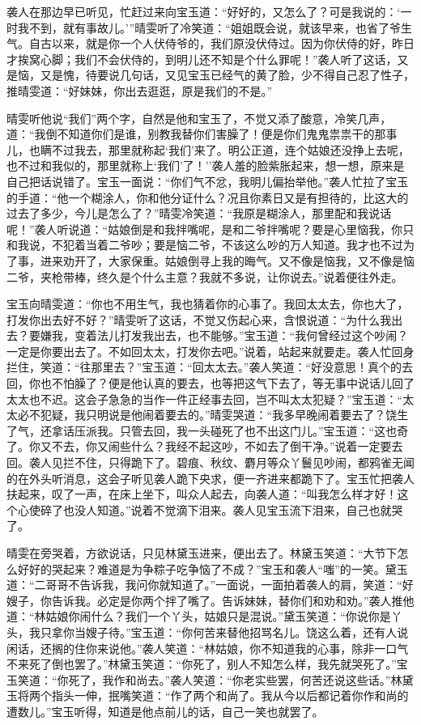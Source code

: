 袭人在那边早已听见，忙赶过来向宝玉道：``好好的，又怎么了？可是我说的：`一时我不到，就有事故儿。'''晴雯听了冷笑道：``姐姐既会说，就该早来，也省了爷生气。自古以来，就是你一个人伏侍爷的，我们原没伏侍过。因为你伏侍的好，昨日才挨窝心脚；我们不会伏侍的，到明儿还不知是个什么罪呢！''袭人听了这话，又是恼，又是愧，待要说几句话，又见宝玉已经气的黄了脸，少不得自己忍了性子，推晴雯道：``好妹妹，你出去逛逛，原是我们的不是。''

晴雯听他说``我们''两个字，自然是他和宝玉了，不觉又添了酸意，冷笑几声，道：``我倒不知道你们是谁，别教我替你们害臊了！便是你们鬼鬼祟祟干的那事儿，也瞒不过我去，那里就称起`我们'来了。明公正道，连个姑娘还没挣上去呢，也不过和我似的，那里就称上`我们'了！''袭人羞的脸紫胀起来，想一想，原来是自己把话说错了。宝玉一面说：``你们气不忿，我明儿偏抬举他。''袭人忙拉了宝玉的手道：``他一个糊涂人，你和他分证什么？况且你素日又是有担待的，比这大的过去了多少，今儿是怎么了？''晴雯冷笑道：``我原是糊涂人，那里配和我说话呢！''袭人听说道：``姑娘倒是和我拌嘴呢，是和二爷拌嘴呢？要是心里恼我，你只和我说，不犯着当着二爷吵；要是恼二爷，不该这么吵的万人知道。我才也不过为了事，进来劝开了，大家保重。姑娘倒寻上我的晦气。又不像是恼我，又不像是恼二爷，夹枪带棒，终久是个什么主意？我就不多说，让你说去。''说着便往外走。

宝玉向晴雯道：``你也不用生气，我也猜着你的心事了。我回太太去，你也大了，打发你出去好不好？''晴雯听了这话，不觉又伤起心来，含恨说道：``为什么我出去？要嫌我，变着法儿打发我出去，也不能够。''宝玉道：``我何曾经过这个吵闹？一定是你要出去了。不如回太太，打发你去吧。''说着，站起来就要走。袭人忙回身拦住，笑道：``往那里去？''宝玉道：``回太太去。''袭人笑道：``好没意思！真个的去回，你也不怕臊了？便是他认真的要去，也等把这气下去了，等无事中说话儿回了太太也不迟。这会子急急的当作一件正经事去回，岂不叫太太犯疑？''宝玉道：``太太必不犯疑，我只明说是他闹着要去的。''晴雯哭道：``我多早晚闹着要去了？饶生了气，还拿话压派我。只管去回，我一头碰死了也不出这门儿。''宝玉道：``这也奇了。你又不去，你又闹些什么？我经不起这吵，不如去了倒干净。''说着一定要去回。袭人见拦不住，只得跪下了。碧痕、秋纹、麝月等众丫鬟见吵闹，都鸦雀无闻的在外头听消息，这会子听见袭人跪下央求，便一齐进来都跪下了。宝玉忙把袭人扶起来，叹了一声，在床上坐下，叫众人起去，向袭人道：``叫我怎么样才好！这个心使碎了也没人知道。''说着不觉滴下泪来。袭人见宝玉流下泪来，自己也就哭了。

晴雯在旁哭着，方欲说话，只见林黛玉进来，便出去了。林黛玉笑道：``大节下怎么好好的哭起来？难道是为争粽子吃争恼了不成？''宝玉和袭人``嗤''的一笑。黛玉道：``二哥哥不告诉我，我问你就知道了。''一面说，一面拍着袭人的肩，笑道：``好嫂子，你告诉我。必定是你两个拌了嘴了。告诉妹妹，替你们和劝和劝。''袭人推他道：``林姑娘你闹什么？我们一个丫头，姑娘只是混说。''黛玉笑道：``你说你是丫头，我只拿你当嫂子待。''宝玉道：``你何苦来替他招骂名儿。饶这么着，还有人说闲话，还搁的住你来说他。''袭人笑道：``林姑娘，你不知道我的心事，除非一口气不来死了倒也罢了。''林黛玉笑道：``你死了，别人不知怎么样，我先就哭死了。''宝玉笑道：``你死了，我作和尚去。''袭人笑道：``你老实些罢，何苦还说这些话。''林黛玉将两个指头一伸，抿嘴笑道：``作了两个和尚了。我从今以后都记着你作和尚的遭数儿。''宝玉听得，知道是他点前儿的话，自己一笑也就罢了。

